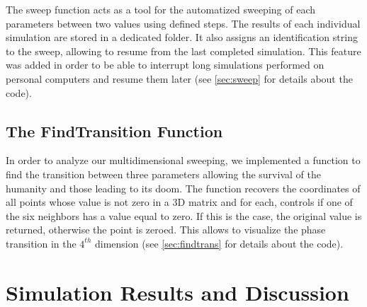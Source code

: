 \documentclass[11pt]{article} %
\begin{document}
The sweep function acts as a tool for the automatized sweeping of each parameters between two values using defined steps. The results of each individual simulation are stored in a dedicated folder. It also assigns an identification string to the sweep, allowing to resume from the last completed simulation. This feature was added in order to be able to interrupt long simulations performed on personal computers and resume them later (see \ref{sec:sweep} for details about the code).


\subsection{The FindTransition Function}\indent
\label{sec:findTransition}

In order to analyze our multidimensional sweeping, we implemented a function to find the transition between three parameters allowing the survival of the humanity and those leading to its doom. The function recovers the coordinates of all points whose value is not zero in a 3D matrix and for each, controls if one of the six neighbors has a value equal to zero. If this is the case, the original value is returned, otherwise the point is zeroed. This allows to visualize the phase transition in the $4^{th}$ dimension (see \ref{sec:findtrans} for details about the code).





\newpage
\section{Simulation Results and Discussion}\indent
\end{document}
